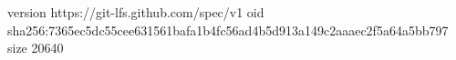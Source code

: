 version https://git-lfs.github.com/spec/v1
oid sha256:7365ec5dc55cee631561bafa1b4fc56ad4b5d913a149c2aaaec2f5a64a5bb797
size 20640
